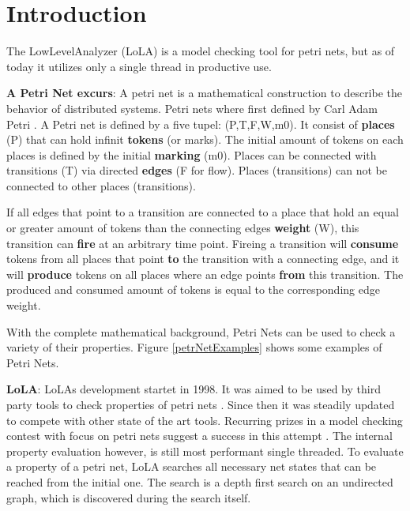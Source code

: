 \chapter{Introduction}

The LowLevelAnalyzer (LoLA) is a model checking tool for petri nets, but as of today it utilizes only a single thread in productive use.

\textbf{A Petri Net excurs}:
A petri net is a mathematical construction to describe the behavior of distributed systems. Petri nets where first defined by Carl Adam Petri \cite{petri1962kommunikation}. A Petri net is defined by a five tupel: (P,T,F,W,m0). It consist of \textbf{places} (P) that can hold infinit \textbf{tokens} (or marks). The initial amount of tokens on each places is defined by the initial \textbf{marking} (m0). Places can be connected with transitions (T) via directed \textbf{edges} (F for flow). Places (transitions) can not be connected to other places (transitions). 

If all edges that point to a transition are connected to a place that hold an equal or greater amount of tokens than the connecting edges \textbf{weight} (W), this transition can \textbf{fire} at an arbitrary time point. Fireing a transition will \textbf{consume} tokens from all places that point \textbf{to} the transition with a connecting edge, and it will \textbf{produce} tokens on all places where an edge points \textbf{from} this transition. The produced and consumed amount of tokens is equal to the corresponding edge weight.

With the complete mathematical background, Petri Nets can be used to check a variety of their properties. Figure \ref{petrNetExamples} shows some examples of Petri Nets.



\textbf{LoLA}:
LoLAs development startet in 1998. It was aimed to be used by third party tools to check properties of petri nets \cite{schmidt2000lola}. Since then it was steadily updated to compete with other state of the art tools. Recurring prizes in a model checking contest with focus on petri nets suggest a success in this attempt \cite{MCC2017}.
The internal property evaluation however, is still most performant single threaded. To evaluate a property of a petri net, LoLA searches all necessary net states that can be reached from the initial one. The search is a depth first search on an undirected graph, which is discovered during the search itself.

